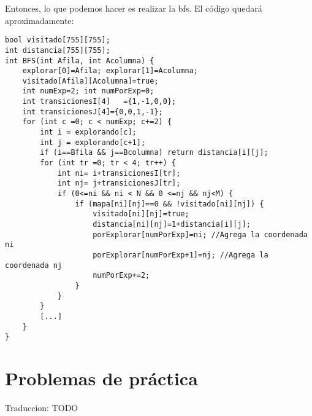 Entonces, lo que podemos hacer es realizar la bfs. El código quedará aproximadamente:

\begin{minipage}{\linewidth}
\begin{lstlisting}
bool visitado[755][755];
int distancia[755][755];
int BFS(int Afila, int Acolumna) {
	explorar[0]=Afila; explorar[1]=Acolumna;
	visitado[Afila][Acolumna]=true;
	int numExp=2; int numPorExp=0;
	int transicionesI[4]   ={1,-1,0,0};
	int transicionesJ[4]={0,0,1,-1};
	for (int c =0; c < numExp; c+=2) {
		int i = explorando[c];
		int j = explorando[c+1];
		if (i==Bfila && j==Bcolumna) return distancia[i][j];
		for (int tr =0; tr < 4; tr++) {
			int ni= i+transicionesI[tr];
			int nj= j+transicionesJ[tr];
			if (0<=ni && ni < N && 0 <=nj && nj<M) {
				if (mapa[ni][nj]==0 && !visitado[ni][nj]) {
					visitado[ni][nj]=true;
					distancia[ni][nj]=1+distancia[i][j];
					porExplorar[numPorExp]=ni; //Agrega la coordenada ni
					porExplorar[numPorExp+1]=nj; //Agrega la coordenada nj
					numPorExp+=2;
				}
			}
		}
		[...]
	}
}
\end{lstlisting}
\end{minipage}

\section*{Problemas de práctica}

\begin{exercise}
	Traduccion: TODO
\end{exercise}

\begin{exercise}
\end{exercise}

\begin{exercise}
\end{exercise} 

\begin{exercise}
\end{exercise}
